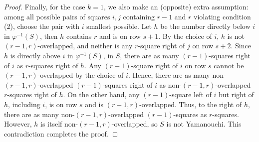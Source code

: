\documentclass[10pt,a4paper]{article}
\theoremstyle{definition}
\numberwithin{equation}{section}
\begin{document}
\begin{proof}
        Finally, for the case $k = 1$, we also make an (opposite) extra assumption: among all possible pairs of squares $i,j$ containing $r-1$ and $r$ violating condition (2), choose the pair with $i$ smallest possible. Let $h$ be the number directly below $i$ in $\varphi^{-1}(S)$, then $h$ contains $r$ and is on row $s+1$. By the choice of $i$, $h$ is not $(r-1,r)$-overlapped, and neither is any $r$-square right of $j$ on row $s+2$. Since $h$ is directly above $i$ in $\varphi^{-1}(S)$, in $S$, there are as many $(r-1)$-squares right of $i$ as $r$-squares right of $h$. Any $(r-1)$-square right of $i$ on row $s$ cannot be $(r-1,r)$-overlapped by the choice of $i$. Hence, there are as many non-$(r-1,r)$-overlapped $(r-1)$-squares right of $i$ as non-$(r-1,r)$-overlapped $r$-squares right of $h$. On the other hand, any $(r-1)$-square left of $i$ but right of $h$, including $i$, is on row $s$ and is $(r-1,r)$-overlapped. Thus, to the right of $h$, there are as many non-$(r-1,r)$-overlapped $(r-1)$-squares as $r$-squares. However, $h$ is itself non-$(r-1,r)$-overlapped, so $S$ is not Yamanouchi. This contradiction completes the proof.
    \end{proof}
\end{document}
